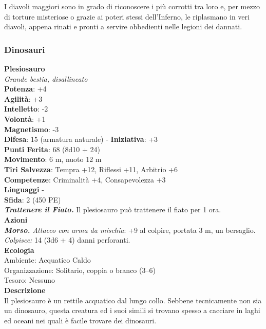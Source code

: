 \begin{multicols}{2}
I diavoli maggiori sono in grado di riconoscere i più corrotti tra loro e, per mezzo di torture misteriose o grazie ai poteri stessi dell’Inferno, le riplasmano in veri diavoli, appena rinati e pronti a servire obbedienti nelle legioni dei dannati.\\

\subsubsection{Dinosauri}

\medskip\textbf{Plesiosauro}\\
\emph{Grande bestia, disallineato}\\
\textbf{Potenza}: +4\\
\textbf{Agilità}: +3\\
\textbf{Intelletto}: -2\\
\textbf{Volontà}: +1\\
\textbf{Magnetismo}: -3\\
\textbf{Difesa}: 15 (armatura naturale) - \textbf{Iniziativa}: +3\\
\textbf{Punti Ferita}: 68 (8d10 + 24)\\
\textbf{Movimento}: 6 m, nuoto 12 m\\
\textbf{Tiri Salvezza}: Tempra +12, Riflessi +11, Arbitrio +6\\
\textbf{Competenze}: Criminalità +4, Consapevolezza +3\\
\textbf{Linguaggi} -\\
\textbf{Sfida}: 2 (450 PE)\smallskip\\
\emph{\textbf{Trattenere il Fiato.}} Il plesiosauro può trattenere il fiato per 1 ora.\\
\smallskip\textbf{Azioni}\\
\emph{\textbf{Morso.} Attacco con arma da mischia}: +9 al colpire, portata 3 m, un bersaglio.\\
\emph{Colpisce:} 14 (3d6 + 4) danni perforanti. \\
\textbf{Ecologia}\\
Ambiente: Acquatico Caldo\\
Organizzazione: Solitario, coppia o branco (3–6)\\
Tesoro: Nessuno\\
\textbf{Descrizione}\\
Il plesiosauro è un rettile acquatico dal lungo collo. Sebbene tecnicamente non sia un dinosauro, questa creatura ed i suoi simili si trovano spesso a cacciare in laghi ed oceani nei quali è facile trovare dei dinosauri.\\


\end{multicols}
